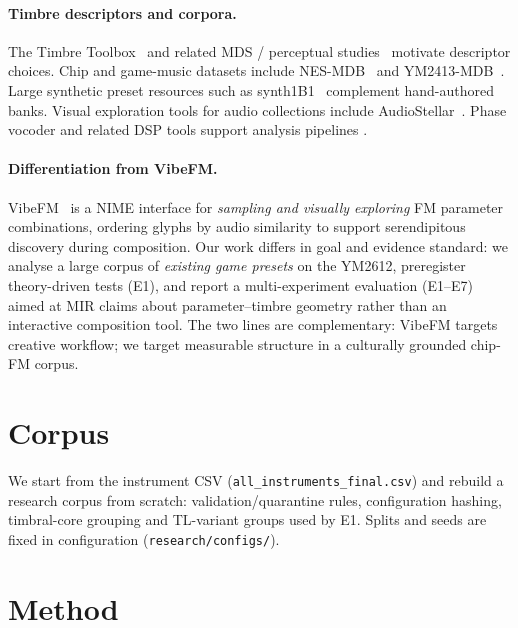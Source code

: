 \documentclass{article}
\begin{document}
\paragraph{Timbre descriptors and corpora.}
The Timbre Toolbox~\citep{peeters2011} and related MDS /
perceptual studies~\citep{mcadams1995,terasawa2005,schubert2006}
motivate descriptor choices.
Chip and game-music datasets include NES-MDB~\citep{donahue2018} and
YM2413-MDB~\citep{choi2022}.
Large synthetic preset resources such as synth1B1~\citep{turian2021}
complement hand-authored banks.
Visual exploration tools for audio collections include
AudioStellar~\citep{garber2021}.
Phase vocoder and related DSP tools support analysis pipelines
\cite{driedger2014,caceres2007}.

\paragraph{Differentiation from VibeFM.}
VibeFM~\citep{rau2026vibefm} is a NIME interface for \emph{sampling and visually
exploring} FM parameter combinations, ordering glyphs by audio similarity to
support serendipitous discovery during composition.
Our work differs in goal and evidence standard: we analyse a large corpus of
\emph{existing game presets} on the YM2612, preregister theory-driven tests
(E1), and report a multi-experiment evaluation (E1--E7) aimed at MIR claims
about parameter--timbre geometry rather than an interactive composition tool.
The two lines are complementary: VibeFM targets creative workflow; we target
measurable structure in a culturally grounded chip-FM corpus.

\section{Corpus}
\label{sec:corpus}

We start from the instrument CSV
(\texttt{all\_instruments\_final.csv}) and rebuild a research corpus from
scratch: validation/quarantine rules, configuration hashing, timbral-core
grouping and TL-variant groups used by E1.
Splits and seeds are fixed in configuration
(\texttt{research/configs/}).

\section{Method}
\label{sec:method}
\end{document}
